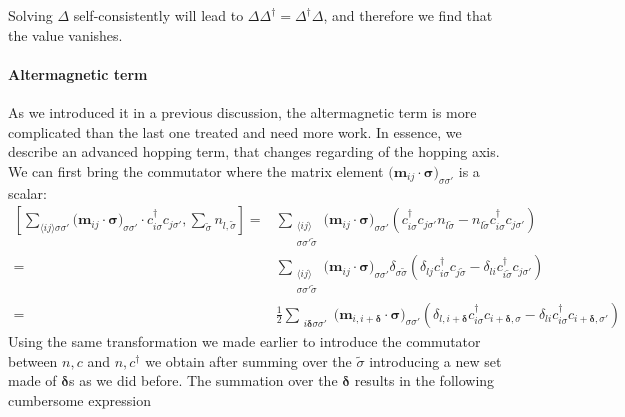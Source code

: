 \documentclass[../main.tex]{subfile}
\begin{document}
Solving $\Delta$ self-consistently will lead to $\Delta\Delta^{\dagger} = \Delta^{\dagger}\Delta$, and therefore we find that the value vanishes.

\paragraph{Altermagnetic term} $~$\\
As we introduced it in a previous discussion, the altermagnetic term is more complicated than the last one treated and need more work. In essence, we describe an 
advanced hopping term, that changes regarding of the hopping axis.
We can first bring the commutator where the matrix element $\bigl(\bm{m}_{ij}\cdot\bm{\sigma}\bigr)_{\sigma\sigma'} $ is a scalar:
\begin{equation*}
    \begin{aligned}
    \left[\sum_{\langle i j \rangle\sigma\sigma'}\bigl(\bm{m}_{ij}\cdot\bm{\sigma}\bigr)_{\sigma\sigma'} 
         \cdot c_{i\sigma}^{\dagger}c_{j\sigma'}, \sum_{\tilde{\sigma}} n_{l,\tilde{\sigma}}\right] 
        =&\sum_{\substack{\langle i j \rangle \\\sigma\sigma'\tilde{\sigma}}} 
         \bigl(\bm{m}_{ij}\cdot\bm{\sigma}\bigr)_{\sigma\sigma'}  \left(c_{i\sigma}^{\dagger}c_{j\sigma'}n_{l\tilde{\sigma}} 
        -n_{l\tilde{\sigma}}c_{i\sigma}^{\dagger}c_{j\sigma'} \right)\\
        = &\sum_{\substack{\langle i j \rangle \\\sigma\sigma'\tilde{\sigma}}}  \bigl(\bm{m}_{ij}\cdot\bm{\sigma}\bigr)_{\sigma\sigma'}  
         \delta_{\sigma\tilde{\sigma}} \left(\delta_{lj}c_{i\sigma}^{\dagger}c_{j\tilde{\sigma}} - \delta_{li}c_{i\tilde{\sigma}}^{\dagger}c_{j\sigma'}\right)\\
        = &\frac{1}{2}\sum_{\substack{ i \bm{\delta}\sigma\sigma'}}  \bigl(\bm{m}_{i,i+\bm{\delta}}\cdot\bm{\sigma}\bigr)_{\sigma\sigma'}  
         \left(\delta_{l,i+\bm{\delta}}c_{i\sigma}^{\dagger}c_{i+\bm{\delta},\sigma} - \delta_{li}c_{i\sigma}^{\dagger}c_{i+\bm{\delta},\sigma'}\right)
    \end{aligned}
\end{equation*}
Using the same transformation we made earlier to introduce the commutator between $n,c$ and $n,c^{\dagger}$ we obtain after summing over the $\tilde{\sigma}$
introducing a new set made of  $\bm{\delta}$s as we did before. The summation over the $\bm{\delta}$ results in the following cumbersome expression
\end{document}
